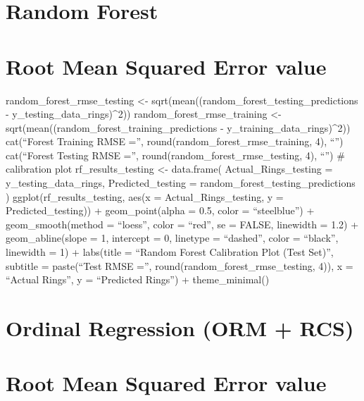 \documentclass[
  letterpaper,
  DIV=11,
  numbers=noendperiod]{scrreprt}
\begin{document}
{

\chapter{Random Forest}\label{random-forest}


\chapter{Root Mean Squared Error
value}\label{root-mean-squared-error-value}

random\_forest\_rmse\_testing \textless-
sqrt(mean((random\_forest\_testing\_predictions -
y\_testing\_data\_rings)\^{}2)) random\_forest\_rmse\_training
\textless- sqrt(mean((random\_forest\_training\_predictions -
y\_training\_data\_rings)\^{}2)) cat(``\nRandom Forest Training RMSE
='', round(random\_forest\_rmse\_training, 4), ``\n'')
cat(``\nRandom Forest Testing RMSE ='',
round(random\_forest\_rmse\_testing, 4), ``\n'') \# calibration plot
rf\_results\_testing \textless- data.frame( Actual\_Rings\_testing =
y\_testing\_data\_rings, Predicted\_testing =
random\_forest\_testing\_predictions ) ggplot(rf\_results\_testing,
aes(x = Actual\_Rings\_testing, y = Predicted\_testing)) +
geom\_point(alpha = 0.5, color = ``steelblue'') + geom\_smooth(method =
``loess'', color = ``red'', se = FALSE, linewidth = 1.2) +
geom\_abline(slope = 1, intercept = 0, linetype = ``dashed'', color =
``black'', linewidth = 1) + labs(title = ``Random Forest Calibration
Plot (Test Set)'', subtitle = paste(``Test RMSE ='',
round(random\_forest\_rmse\_testing, 4)), x = ``Actual Rings'', y =
``Predicted Rings'') + theme\_minimal()


\chapter{Ordinal Regression (ORM +
RCS)}\label{ordinal-regression-orm-rcs}


\chapter{Root Mean Squared Error
value}\label{root-mean-squared-error-value-1}

}
\end{document}
